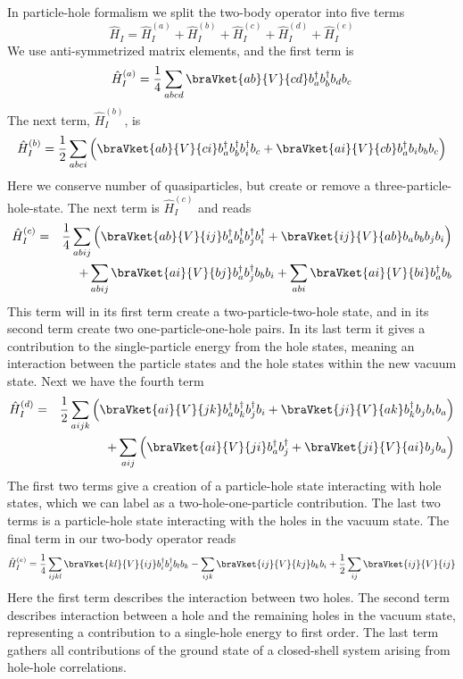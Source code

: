 	In particle-hole formalism we split the two-body operator into five terms
	\[
		\hat{H}_{I}=\hat{H}_{I}^{\left(a\right)}+\hat{H}_{I}^{\left(b\right)}+\hat{H}_{I}^{\left(c\right)}+\hat{H}_{I}^{\left(d\right)}+\hat{H}_{I}^{\left(e\right)}
	\]
	We use anti-symmetrized matrix elements, and the first term is
	\[
		\hat{H}_{I}^{\left(a\right)}=\frac{1}{4}\sum_{abcd}\braVket{ab}{V}{cd}b_{a}^{\dagger}b_{b}^{\dagger}b_{d}b_{c}
	\]
	The next term, $\hat{H}_{I}^{(b)}$, is
	\[
		\hat{H}_{I}^{\left(b\right)}=\frac{1}{2}\sum_{abci}\left(\braVket{ab}{V}{ci}b_{a}^{\dagger}b_{b}^{\dagger}b_{i}^{\dagger}b_{c}+\braVket{ai}{V}{cb}b_{a}^{\dagger}b_{i}b_{b}b_{c}\right)
	\]
	Here we conserve number of quasiparticles, but create or remove a three-particle-hole-state. The next term is $\hat{H}_{I}^{(c)}$ and reads
	\begin{eqnarray*}
		\hat{H}_{I}^{\left(c\right)} & = & \frac{1}{4}\sum_{abij}\left(\braVket{ab}{V}{ij}b_{a}^{\dagger}b_{b}^{\dagger}b_{j}^{\dagger}b_{i}^{\dagger}+\braVket{ij}{V}{ab}b_{a}b_{b}b_{j}b_{i}\right)\\
		 &  & +\sum_{abij}\braVket{ai}{V}{bj}b_{a}^{\dagger}b_{j}^{\dagger}b_{b}b_{i}+\sum_{abi}\braVket{ai}{V}{bi}b_{a}^{\dagger}b_{b}
	\end{eqnarray*}
	This term will in its first term create a two-particle-two-hole state, and in its second term create two one-particle-one-hole pairs. In its last term it gives a contribution to the single-particle energy from the hole states, meaning an interaction between the particle states and the hole states within the new vacuum state. Next we have the fourth term
	\begin{eqnarray*}
		\hat{H}_{I}^{\left(d\right)} & = & \frac{1}{2}\sum_{aijk}\left(\braVket{ai}{V}{jk}b_{a}^{\dagger}b_{k}^{\dagger}b_{j}^{\dagger}b_{i}+\braVket{ji}{V}{ak}b_{k}^{\dagger}b_{j}b_{i}b_{a}\right)\\
		 &  & +\sum_{aij}\left(\braVket{ai}{V}{ji}b_{a}^{\dagger}b_{j}^{\dagger}+\braVket{ji}{V}{ai}b_{j}b_{a}\right)
	\end{eqnarray*}
	The first two terms give a creation of a particle-hole state interacting with hole states, which we can label as a two-hole-one-particle contribution. The last two terms is a particle-hole state interacting with the holes in the vacuum state. The final term in our two-body operator reads
	\[
		\hat{H}_{I}^{\left(e\right)}=\frac{1}{4}\sum_{ijkl}\braVket{kl}{V}{ij}b_{i}^{\dagger}b_{j}^{\dagger}b_{l}b_{k}-\sum_{ijk}\braVket{ij}{V}{kj}b_{k}b_{i}+\frac{1}{2}\sum_{ij}\braVket{ij}{V}{ij}
	\]
	Here the first term describes the interaction between two holes. The second term describes interaction between a hole and the remaining holes in the vacuum state, representing a contribution to a single-hole energy to first order. The last term gathers all contributions of the ground state of a closed-shell system arising from hole-hole correlations. 


